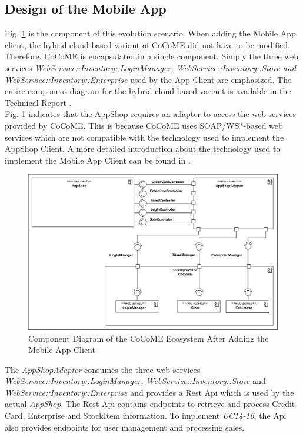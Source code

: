 \subsection{Design of the Mobile App}\label{DesignMobileApp}
 Fig. \ref{ComponentApp} is the component of this evolution scenario. When adding the Mobile App client, the hybrid cloud-based variant of CoCoME did not have to be modified. Therefore, CoCoME is encapsulated in a single component. Simply the three web services \textit{WebService::Inventory::LoginManager, WebService::Inventory::Store and WebService::Inventory::Enterprise} used by the App Client are emphasized. The entire component diagram for the hybrid cloud-based variant is available in the Technical Report \cite{HeinrichRostamiReussner2016_1000052688}. 
 \\ Fig. \ref{ComponentApp} indicates that the AppShop requires an adapter to access the web services provided by CoCoME. This is because CoCoME uses SOAP/WS*-based web services which are not compatible with the technology used to implement the AppShop Client. A more detailed introduction about the technology used to implement the Mobile App Client can be found in \cite{schnabel}. 
  
 \begin{figure}[!h]
	\includegraphics[width=\textwidth]{img/appComponent.png}
	\caption{Component Diagram of the CoCoME Ecosystem After Adding the Mobile App Client}
	\label{ComponentApp}
\end{figure}
\noindent
  The \textit{AppShopAdapter} consumes the three web services \textit{WebService::Inventory::LoginManager, WebService::Inventory::Store} and \textit{WebService::Inventory::Enterprise} and provides a Rest Api which is used by the actual \textit{AppShop}. The Rest Api contains endpoints to retrieve and process Credit Card, Enterprise and StockItem information. To implement \emph{UC14-16}, the Api also provides endpoints for user management and processing sales. 
  
